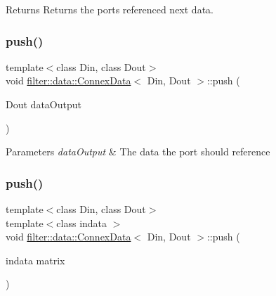 \begin{DoxyReturn}{Returns}
Returns the port\textquotesingle{}s referenced next data. 
\end{DoxyReturn}
\mbox{\label{classfilter_1_1data_1_1_connex_data_a703d8b2465a59a9c8ca79436a1ddfa2b}} 
\subsubsection{\texorpdfstring{push()}{push()}\hspace{0.1cm}{\footnotesize\ttfamily [1/2]}}
{\footnotesize\ttfamily template$<$class Din, class Dout$>$ \\
void \hyperlink{classfilter_1_1data_1_1_connex_data}{filter\+::data\+::\+Connex\+Data}$<$ Din, Dout $>$\+::push (\begin{DoxyParamCaption}\item[{Dout}]{data\+Output }\end{DoxyParamCaption})\hspace{0.3cm}{\ttfamily [inline]}}


\begin{DoxyParams}{Parameters}
{\em data\+Output} & The data the port should reference \\
\hline
\end{DoxyParams}
\mbox{\label{classfilter_1_1data_1_1_connex_data_af5ed83082314838718aee4fbda767ff9}} 
\subsubsection{\texorpdfstring{push()}{push()}\hspace{0.1cm}{\footnotesize\ttfamily [2/2]}}
{\footnotesize\ttfamily template$<$class Din, class Dout$>$ \\
template$<$class indata $>$ \\
void \hyperlink{classfilter_1_1data_1_1_connex_data}{filter\+::data\+::\+Connex\+Data}$<$ Din, Dout $>$\+::push (\begin{DoxyParamCaption}\item[{indata}]{matrix }\end{DoxyParamCaption})\hspace{0.3cm}{\ttfamily [inline]}}


